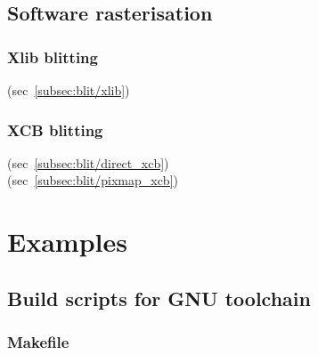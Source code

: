 \documentclass{article}
\begin{document}
\subsection{Software rasterisation}
\label{subsec:software-rasterisation}


\subsubsection{Xlib blitting}
\label{subsubsection:xlib-blitting}

(sec~\ref{subsec:blit/xlib})


\subsubsection{XCB blitting}
\label{subsubsection:xcb-blitting}

(sec~\ref{subsec:blit/direct_xcb})
\\
(sec~\ref{subsec:blit/pixmap_xcb})


\pagebreak
\section{Examples}
\label{sec:examples}


\subsection{Build scripts for GNU toolchain}
\label{subsec:build-scripts-gnu}

\subsubsection{Makefile}
\label{subsubsec:makefile}
\end{document}
